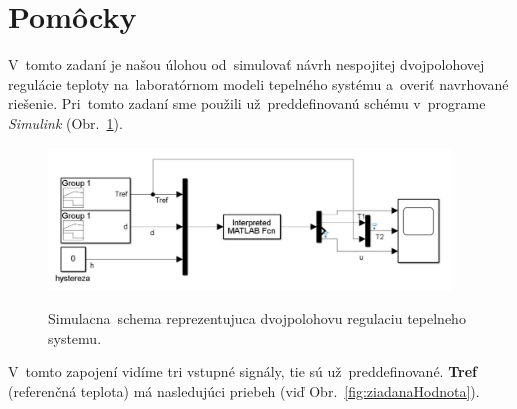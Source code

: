 \documentclass{article}
\begin{document}
\clearpage

\section{Pomôcky}
\label{sec:pomocky}

V~tomto zadaní je našou úlohou od~simulovať návrh nespojitej dvojpolohovej regulácie teploty na~laboratórnom
modeli tepelného systému a~overiť navrhované riešenie. Pri~tomto zadaní sme použili už~preddefinovanú schému
v~programe \textit{Simulink} (Obr.~\ref{fig:schema}).

\begin{figure}[!htbp]
	\begin{center}
		\includegraphics[width=0.95\textwidth]{./include/schema.png}
		\label{fig:schema}
		\caption{Simulacna~schema reprezentujuca dvojpolohovu regulaciu tepelneho systemu.}
	\end{center}
\end{figure}

V~tomto zapojení vidíme tri vstupné signály, tie sú už~preddefinované. \textbf{Tref} (referenčná teplota)
má nasledujúci priebeh (viď Obr.~\ref{fig:ziadanaHodnota}).
\end{document}

